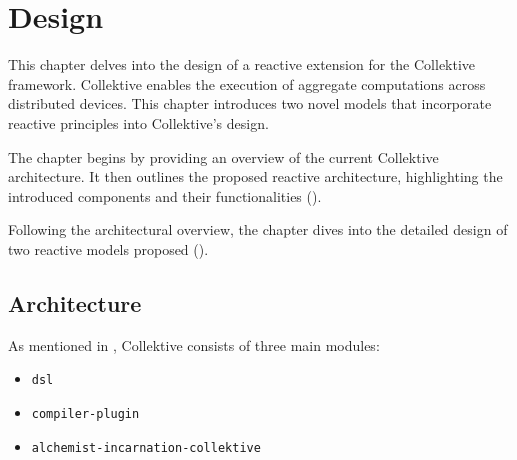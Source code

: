 
\chapter{Design}
\label{chap:design}

This chapter delves into the design of a reactive extension for the Collektive framework. Collektive enables the execution of aggregate computations across distributed devices. This chapter introduces two novel models that incorporate reactive principles into Collektive's design.

The chapter begins by providing an overview of the current Collektive architecture. It then outlines the proposed reactive architecture, highlighting the introduced components and their functionalities ().

Following the architectural overview, the chapter dives into the detailed design of two reactive models proposed ().

\section{Architecture}
\label{section:architecture}

As mentioned in , Collektive consists of three main modules:

\begin{itemize}
    \item \texttt{dsl}
    \item \texttt{compiler-plugin}
    \item \texttt{alchemist-incarnation-collektive}
\end{itemize}

